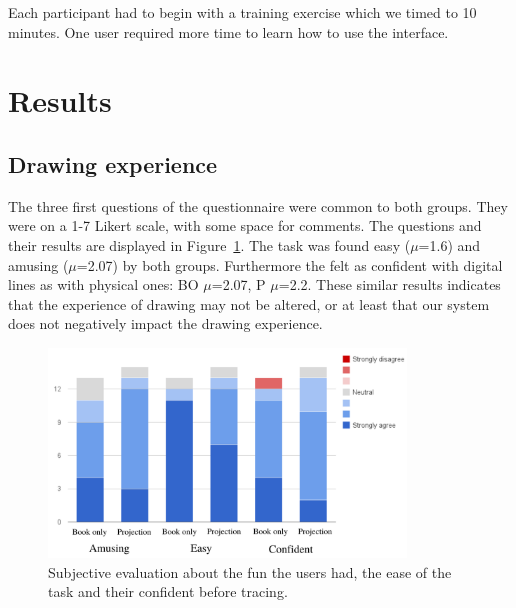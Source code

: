 \documentclass{sigchi}
\begin{document}
  Each participant had to begin with a training exercise which we timed
  to 10 minutes. One user required more time to learn how to use the
  interface. 


\section{Results}

\subsection{Drawing experience}
The three first questions of the questionnaire were common to both
groups. They were on a 1-7 Likert scale, with some space for comments. 
The questions and their results are displayed in Figure~\ref{fig:amusing}. 
The task was found easy ($\mu$=1.6) and amusing ($\mu$=2.07) by both
groups. Furthermore the felt as confident with digital lines as
with physical ones: BO $\mu$=2.07, P $\mu$=2.2. 
These similar results indicates that the experience of
drawing may not be altered, or at least that our system does not
negatively impact the drawing experience. 







  

\begin{figure}[t!]
       \hspace{-5mm}
  \includegraphics[width=95mm]{amusant.pdf}
  \caption{Subjective evaluation about the fun the users had, the ease
    of the task and their confident before tracing.}
  \label{fig:amusing}
\end{figure}
\end{document}
